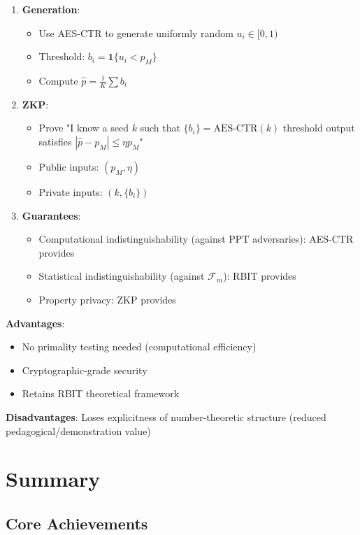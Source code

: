 \documentclass[12pt]{article}
\theoremstyle{plain}
\theoremstyle{definition}
\begin{document}
\begin{enumerate}
\item \textbf{Generation}:
\begin{itemize}
   \item Use AES-CTR to generate uniformly random $u_i \in [0,1)$
   \item Threshold: $b_i = \mathbf{1}\{u_i < p_M\}$
   \item Compute $\hat{p} = \frac{1}{K}\sum b_i$
\end{itemize}

\item \textbf{ZKP}:
\begin{itemize}
   \item Prove "I know a seed $k$ such that $\{b_i\} = \text{AES-CTR}(k)$ threshold output satisfies $|\hat{p} - p_M| \le \eta p_M$"
   \item Public inputs: $(p_M, \eta)$
   \item Private inputs: $(k, \{b_i\})$
\end{itemize}

\item \textbf{Guarantees}:
\begin{itemize}
   \item Computational indistinguishability (against PPT adversaries): AES-CTR provides
   \item Statistical indistinguishability (against $\mathcal{F}_m$): RBIT provides
   \item Property privacy: ZKP provides
\end{itemize}
\end{enumerate}

\textbf{Advantages}:
\begin{itemize}
\item No primality testing needed (computational efficiency)
\item Cryptographic-grade security
\item Retains RBIT theoretical framework
\end{itemize}

\textbf{Disadvantages}: Loses explicitness of number-theoretic structure (reduced pedagogical/demonstration value)

\section{Summary}

\subsection{Core Achievements}
\end{document}
